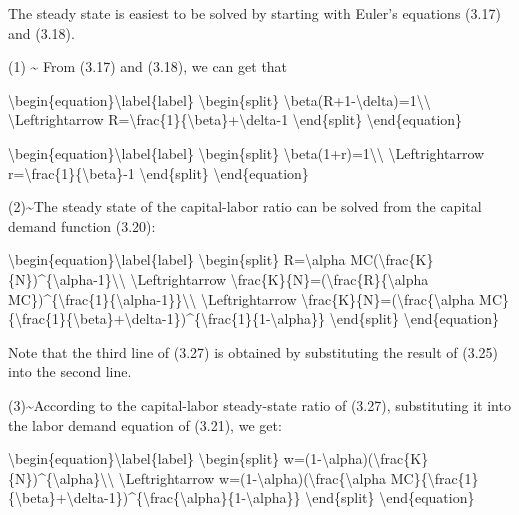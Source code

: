 \documentclass[10pt,math=newtx,citestyle=gb7714-2015,bibstyle=gb7714-2015]{elegantbook}
\begin{document}
	The steady state is easiest to be solved by starting with Euler's equations (3.17) and (3.18).
	
	(1) \~{} From (3.17) and (3.18), we can get that
	
	\textbackslash{}begin\{equation\}\textbackslash{}label\{label\}
	\textbackslash{}begin\{split\}
	\textbackslash{}beta(R+1-\textbackslash{}delta)=1\textbackslash{}\textbackslash{}
	\textbackslash{}Leftrightarrow R=\textbackslash{}frac\{1\}\{\textbackslash{}beta\}+\textbackslash{}delta-1
	\textbackslash{}end\{split\}
	\textbackslash{}end\{equation\}
	
	\textbackslash{}begin\{equation\}\textbackslash{}label\{label\}
	\textbackslash{}begin\{split\}
	\textbackslash{}beta(1+r)=1\textbackslash{}\textbackslash{}
	\textbackslash{}Leftrightarrow r=\textbackslash{}frac\{1\}\{\textbackslash{}beta\}-1
	\textbackslash{}end\{split\}
	\textbackslash{}end\{equation\}
	
	(2)\~{}The steady state of the capital-labor ratio can be solved from the capital demand function (3.20):
	
	\textbackslash{}begin\{equation\}\textbackslash{}label\{label\}
	\textbackslash{}begin\{split\}
	R=\textbackslash{}alpha MC(\textbackslash{}frac\{K\}\{N\})\^{}\{\textbackslash{}alpha-1\}\textbackslash{}\textbackslash{}
	\textbackslash{}Leftrightarrow \textbackslash{}frac\{K\}\{N\}=(\textbackslash{}frac\{R\}\{\textbackslash{}alpha MC\})\^{}\{\textbackslash{}frac\{1\}\{\textbackslash{}alpha-1\}\}\textbackslash{}\textbackslash{}
	\textbackslash{}Leftrightarrow \textbackslash{}frac\{K\}\{N\}=(\textbackslash{}frac\{\textbackslash{}alpha MC\}\{\textbackslash{}frac\{1\}\{\textbackslash{}beta\}+\textbackslash{}delta-1\})\^{}\{\textbackslash{}frac\{1\}\{1-\textbackslash{}alpha\}\}
	\textbackslash{}end\{split\}
	\textbackslash{}end\{equation\}
	
	Note that the third line of (3.27) is obtained by substituting the result of (3.25) into the second line.
	
	(3)\~{}According to the capital-labor steady-state ratio of (3.27), substituting it into the labor demand equation of (3.21), we get:
	
	\textbackslash{}begin\{equation\}\textbackslash{}label\{label\}
	\textbackslash{}begin\{split\}
	w=(1-\textbackslash{}alpha)(\textbackslash{}frac\{K\}\{N\})\^{}\{\textbackslash{}alpha\}\textbackslash{}\textbackslash{}
	\textbackslash{}Leftrightarrow w=(1-\textbackslash{}alpha)(\textbackslash{}frac\{\textbackslash{}alpha MC\}\{\textbackslash{}frac\{1\}\{\textbackslash{}beta\}+\textbackslash{}delta-1\})\^{}\{\textbackslash{}frac\{\textbackslash{}alpha\}\{1-\textbackslash{}alpha\}\}
	\textbackslash{}end\{split\}
	\textbackslash{}end\{equation\}
	
\end{document}

